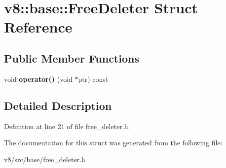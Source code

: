 \hypertarget{structv8_1_1base_1_1FreeDeleter}{}\section{v8\+:\+:base\+:\+:Free\+Deleter Struct Reference}
\label{structv8_1_1base_1_1FreeDeleter}
\subsection*{Public Member Functions}
\begin{DoxyCompactItemize}
\item 
\mbox{\label{structv8_1_1base_1_1FreeDeleter_a9d5ab4b8502cee7c2e1938bcaecc0161}} 
void {\bfseries operator()} (void $\ast$ptr) const
\end{DoxyCompactItemize}


\subsection{Detailed Description}


Definition at line 21 of file free\+\_\+deleter.\+h.



The documentation for this struct was generated from the following file\+:\begin{DoxyCompactItemize}
\item 
v8/src/base/free\+\_\+deleter.\+h\end{DoxyCompactItemize}
